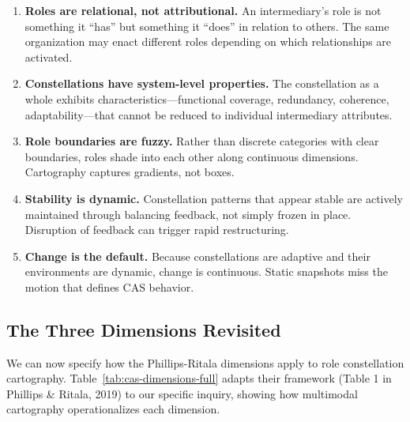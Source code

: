\documentclass[../main.tex]{subfiles}
\begin{document}
\begin{enumerate}[leftmargin=*, itemsep=0.4em]
\item \textbf{Roles are relational, not attributional.} An intermediary's role is not something it ``has'' but something it ``does'' in relation to others. The same organization may enact different roles depending on which relationships are activated.

\item \textbf{Constellations have system-level properties.} The constellation as a whole exhibits characteristics---functional coverage, redundancy, coherence, adaptability---that cannot be reduced to individual intermediary attributes.

\item \textbf{Role boundaries are fuzzy.} Rather than discrete categories with clear boundaries, roles shade into each other along continuous dimensions. Cartography captures gradients, not boxes.

\item \textbf{Stability is dynamic.} Constellation patterns that appear stable are actively maintained through balancing feedback, not simply frozen in place. Disruption of feedback can trigger rapid restructuring.

\item \textbf{Change is the default.} Because constellations are adaptive and their environments are dynamic, change is continuous. Static snapshots miss the motion that defines CAS behavior.
\end{enumerate}

\subsection{The Three Dimensions Revisited}

We can now specify how the Phillips-Ritala dimensions apply to role constellation cartography. Table~\ref{tab:cas-dimensions-full} adapts their framework (Table 1 in Phillips \& Ritala, 2019) to our specific inquiry, showing how multimodal cartography operationalizes each dimension.
\end{document}
